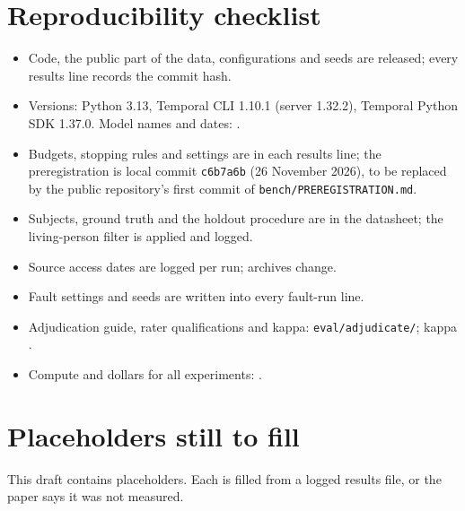 \section{Reproducibility checklist}
\begin{itemize}
\item Code, the public part of the data, configurations and seeds are released; every results line records the commit hash.
\item Versions: Python 3.13, Temporal CLI 1.10.1 (server 1.32.2), Temporal Python SDK 1.37.0. Model names and dates: .
\item Budgets, stopping rules and settings are in each results line; the preregistration is local commit \texttt{c6b7a6b} (26 November 2026), to be replaced by the public repository's first commit of \texttt{bench/PREREGISTRATION.md}.
\item Subjects, ground truth and the holdout procedure are in the datasheet; the living-person filter is applied and logged.
\item Source access dates are logged per run; archives change.
\item Fault settings and seeds are written into every fault-run line.
\item Adjudication guide, rater qualifications and kappa: \texttt{eval/adjudicate/}; kappa .
\item Compute and dollars for all experiments: .
\end{itemize}

\section{Placeholders still to fill}
This draft contains  placeholders. Each is filled from a logged results file, or the paper says it was not measured.
\printtbd
